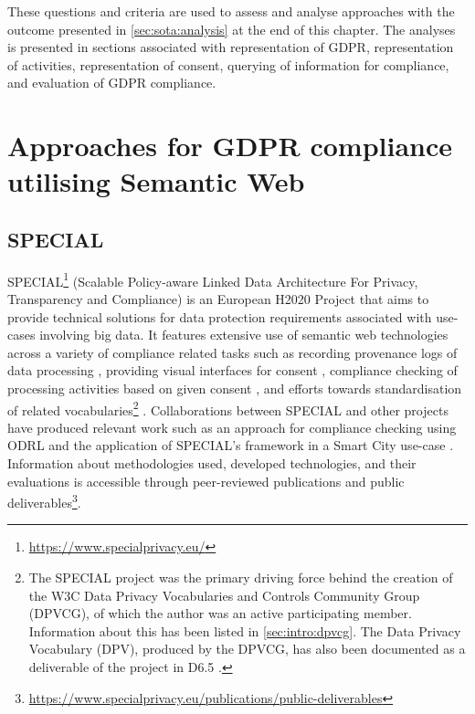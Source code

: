 These questions and criteria are used to assess and analyse approaches with the outcome presented in \autoref{sec:sota:analysis} at the end of this chapter.
The analyses is presented in sections associated with representation of GDPR, representation of activities, representation of consent, querying of information for compliance, and evaluation of GDPR compliance.

\section{Approaches for GDPR compliance utilising Semantic Web}\label{sec:sota:gdpr-semweb}

\subsection*{SPECIAL}\label{sec:sota:SPECIAL}
SPECIAL\footnote{\url{https://www.specialprivacy.eu/}} (Scalable Policy-aware Linked Data Architecture For Privacy, Transparency and Compliance) is an European H2020 Project that aims to provide technical solutions for data protection requirements associated with use-cases involving big data. It features extensive use of semantic web technologies across a variety of compliance related tasks such as recording provenance logs of data processing \cite{kirrane_scalable_2018}, providing visual interfaces for consent \cite{drozd_consent_2019,gritzalis_i_2019}, compliance checking of processing activities based on given consent \cite{westphal_spirit_2018,vos_odrl_2019,fernandez_user_2019}, and efforts towards standardisation of related vocabularies\footnote{The SPECIAL project was the primary driving force behind the creation of the W3C Data Privacy Vocabularies and Controls Community Group (DPVCG), of which the author was an active participating member. Information about this has been listed in \autoref{sec:intro:dpvcg}. The Data Privacy Vocabulary (DPV), produced by the DPVCG, has also been documented as a deliverable of the project in D6.5 \cite{pandit_d6.5_2019}.} \cite{bonatti_data_2018,pandit_creating_2019}.
Collaborations between SPECIAL and other projects have produced relevant work such as an approach for compliance checking using ODRL \cite{agarwal_legislative_2018,vos_odrl_2019} and the application of SPECIAL's framework in a Smart City use-case \cite{fernandez_user_2019}.
Information about methodologies used, developed technologies, and their evaluations is accessible through peer-reviewed publications and public deliverables\footnote{\url{https://www.specialprivacy.eu/publications/public-deliverables}}.


